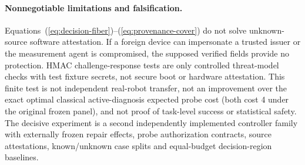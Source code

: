 \paragraph{Nonnegotiable limitations and falsification.}
Equations~(\ref{eq:decision-fiber})--(\ref{eq:provenance-cover}) do
not solve unknown-source software attestation. If a foreign device
can impersonate a trusted issuer or the measurement agent is
compromised, the supposed verified fields provide no protection.
HMAC challenge-response tests are only controlled threat-model
checks with test fixture secrets, not secure boot or hardware
attestation. This finite test is not independent real-robot transfer,
not an improvement over the exact optimal classical active-diagnosis
expected probe cost (both cost 4 under the original frozen panel),
and not proof of task-level success or statistical safety.
The decisive experiment is a second independently implemented
controller family with externally frozen repair effects, probe
authorization contracts, source attestations, known/unknown
case splits and equal-budget decision-region baselines.

